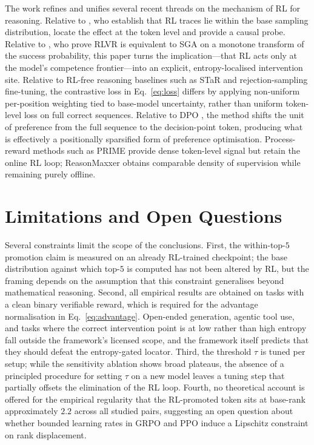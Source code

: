 \documentclass[11pt]{article}
\begin{document}
The work refines and unifies several recent threads on the mechanism of RL for reasoning. Relative to \citet{yue2025passatk}, who establish that RL traces lie within the base sampling distribution, \citet{akgul2026} locate the effect at the token level and provide a causal probe. Relative to \citet{davis2025objective}, who prove RLVR is equivalent to SGA on a monotone transform of the success probability, this paper turns the implication---that RL acts only at the model's competence frontier---into an explicit, entropy-localised intervention site. Relative to RL-free reasoning baselines such as STaR \citep{zelikman2022star} and rejection-sampling fine-tuning, the contrastive loss in Eq.~\eqref{eq:loss} differs by applying non-uniform per-position weighting tied to base-model uncertainty, rather than uniform token-level loss on full correct sequences. Relative to DPO \citep{rafailov2023dpo}, the method shifts the unit of preference from the full sequence to the decision-point token, producing what is effectively a positionally sparsified form of preference optimisation. Process-reward methods such as PRIME \citep{cui2025prime} provide dense token-level signal but retain the online RL loop; ReasonMaxxer obtains comparable density of supervision while remaining purely offline.

\section*{Limitations and Open Questions}

Several constraints limit the scope of the conclusions. First, the within-top-$5$ promotion claim is measured on an already RL-trained checkpoint; the base distribution against which top-$5$ is computed has not been altered by RL, but the framing depends on the assumption that this constraint generalises beyond mathematical reasoning. Second, all empirical results are obtained on tasks with a clean binary verifiable reward, which is required for the advantage normalisation in Eq.~\eqref{eq:advantage}. Open-ended generation, agentic tool use, and tasks where the correct intervention point is at low rather than high entropy fall outside the framework's licensed scope, and the framework itself predicts that they should defeat the entropy-gated locator. Third, the threshold $\tau$ is tuned per setup; while the sensitivity ablation shows broad plateaus, the absence of a principled procedure for setting $\tau$ on a new model leaves a tuning step that partially offsets the elimination of the RL loop. Fourth, no theoretical account is offered for the empirical regularity that the RL-promoted token sits at base-rank approximately $2.2$ across all studied pairs, suggesting an open question about whether bounded learning rates in GRPO and PPO induce a Lipschitz constraint on rank displacement.
\end{document}
